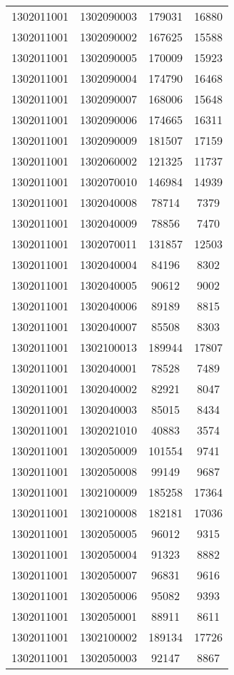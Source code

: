 \begin{longtable}{llcc}
1302011001 & 1302090003 & 179031 & 16880\\
1302011001 & 1302090002 & 167625 & 15588\\
1302011001 & 1302090005 & 170009 & 15923\\
1302011001 & 1302090004 & 174790 & 16468\\
1302011001 & 1302090007 & 168006 & 15648\\
1302011001 & 1302090006 & 174665 & 16311\\
1302011001 & 1302090009 & 181507 & 17159\\
1302011001 & 1302060002 & 121325 & 11737\\
1302011001 & 1302070010 & 146984 & 14939\\
1302011001 & 1302040008 & 78714 & 7379\\
1302011001 & 1302040009 & 78856 & 7470\\
1302011001 & 1302070011 & 131857 & 12503\\
1302011001 & 1302040004 & 84196 & 8302\\
1302011001 & 1302040005 & 90612 & 9002\\
1302011001 & 1302040006 & 89189 & 8815\\
1302011001 & 1302040007 & 85508 & 8303\\
1302011001 & 1302100013 & 189944 & 17807\\
1302011001 & 1302040001 & 78528 & 7489\\
1302011001 & 1302040002 & 82921 & 8047\\
1302011001 & 1302040003 & 85015 & 8434\\
1302011001 & 1302021010 & 40883 & 3574\\
1302011001 & 1302050009 & 101554 & 9741\\
1302011001 & 1302050008 & 99149 & 9687\\
1302011001 & 1302100009 & 185258 & 17364\\
1302011001 & 1302100008 & 182181 & 17036\\
1302011001 & 1302050005 & 96012 & 9315\\
1302011001 & 1302050004 & 91323 & 8882\\
1302011001 & 1302050007 & 96831 & 9616\\
1302011001 & 1302050006 & 95082 & 9393\\
1302011001 & 1302050001 & 88911 & 8611\\
1302011001 & 1302100002 & 189134 & 17726\\
1302011001 & 1302050003 & 92147 & 8867\\

\end{longtable}
